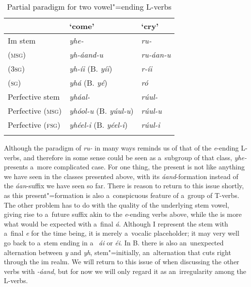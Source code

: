 \begin{table}[ht]
\caption{Partial paradigm for two vowel"=ending L-verbs}
\begin{tabularx}{\textwidth}{ Q Q Q }
\lsptoprule
&
`come' &
`cry'\\\hline
Im stem &
\textit{yhe-} &
\textit{ru-} \\
 (\textsc{msg}) &
\textit{yh-áand-u} &
\textit{ru-áan-u} \\
 (\textsc{3sg}) &
\textit{yh-íi} (B. \textit{yíi}) &
\textit{r-íi} \\
 (\textsc{sg}) &
\textit{yhá} (B. \textit{yé}) &
\textit{ró} \\
Perfective stem &
\textit{yháal-} &
\textit{rúul-} \\
Perfective (\textsc{msg}) &
\textit{yhóol-u} (B. \textit{yúul-u}) &
\textit{rúul-u} \\
Perfective (\textsc{fsg}) &
\textit{yhéel-i} (B. \textit{yéel-i}) &
\textit{rúul-i} \\\lspbottomrule
\end{tabularx}
\label{tab:8-7}
\end{table}


Although the paradigm of \textit{ru- }in many ways reminds us of that of the \textit{e}-ending L-verbs, and therefore in some sense could be seen as a~subgroup of that class, \textit{yhe-} presents a~more complicated case. For one thing, the present  is not like anything we have seen in the classes presented above, with its \textit{áand}-formation instead of the \textit{áan}-suffix we have seen so far. There is reason to return to this issue shortly, as this present"=formation is also a~conspicuous feature of a~group of T-verbs. The other problem has to do with the quality of the underlying stem vowel, giving rise to a~future suffix akin to the \textit{e}-ending verbs above, while the  is more what would be expected with a~final \textit{á}. Although I represent the stem with a~final \textit{e} for the time being, it is merely a~vocalic placeholder; it may very well go back to a~stem ending in a~ \textit{ái} or \textit{éi}. In B. there is also an~unexpected alternation between \textit{y} and \textit{yh}, stem"=initially, an~alternation that cuts right through the im realm. We will return to this issue of  when discussing the other verbs with \textit{-áand}, but for now we will only regard it as an~irregularity among the L-verbs.


